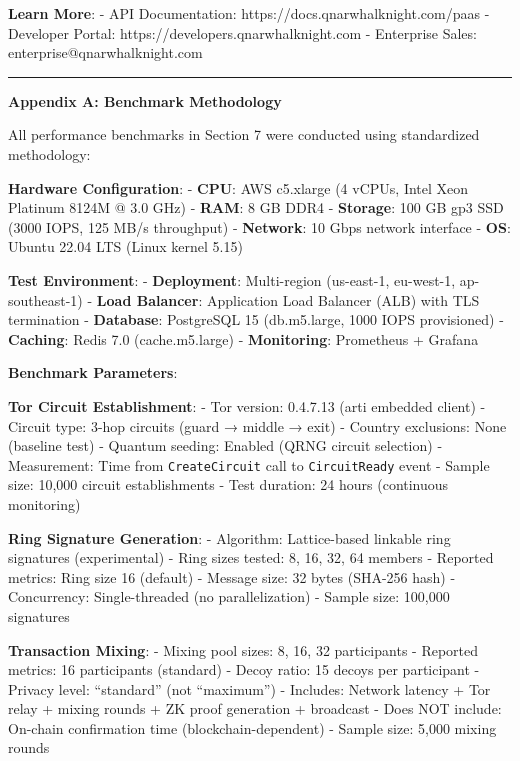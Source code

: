 \documentclass[
  11pt,
]{article}
\begin{document}
\textbf{Learn More}: - API Documentation:
https://docs.qnarwhalknight.com/paas - Developer Portal:
https://developers.qnarwhalknight.com - Enterprise Sales:
enterprise@qnarwhalknight.com

\begin{center}\rule{0.5\linewidth}{0.5pt}\end{center}

\textbf{Appendix A: Benchmark Methodology}

All performance benchmarks in Section 7 were conducted using
standardized methodology:

\textbf{Hardware Configuration}: - \textbf{CPU}: AWS c5.xlarge (4 vCPUs,
Intel Xeon Platinum 8124M @ 3.0 GHz) - \textbf{RAM}: 8 GB DDR4 -
\textbf{Storage}: 100 GB gp3 SSD (3000 IOPS, 125 MB/s throughput) -
\textbf{Network}: 10 Gbps network interface - \textbf{OS}: Ubuntu 22.04
LTS (Linux kernel 5.15)

\textbf{Test Environment}: - \textbf{Deployment}: Multi-region
(us-east-1, eu-west-1, ap-southeast-1) - \textbf{Load Balancer}:
Application Load Balancer (ALB) with TLS termination -
\textbf{Database}: PostgreSQL 15 (db.m5.large, 1000 IOPS provisioned) -
\textbf{Caching}: Redis 7.0 (cache.m5.large) - \textbf{Monitoring}:
Prometheus + Grafana

\textbf{Benchmark Parameters}:

\textbf{Tor Circuit Establishment}: - Tor version: 0.4.7.13 (arti
embedded client) - Circuit type: 3-hop circuits (guard → middle → exit)
- Country exclusions: None (baseline test) - Quantum seeding: Enabled
(QRNG circuit selection) - Measurement: Time from \texttt{CreateCircuit}
call to \texttt{CircuitReady} event - Sample size: 10,000 circuit
establishments - Test duration: 24 hours (continuous monitoring)

\textbf{Ring Signature Generation}: - Algorithm: Lattice-based linkable
ring signatures (experimental) - Ring sizes tested: 8, 16, 32, 64
members - Reported metrics: Ring size 16 (default) - Message size: 32
bytes (SHA-256 hash) - Concurrency: Single-threaded (no parallelization)
- Sample size: 100,000 signatures

\textbf{Transaction Mixing}: - Mixing pool sizes: 8, 16, 32 participants
- Reported metrics: 16 participants (standard) - Decoy ratio: 15 decoys
per participant - Privacy level: ``standard'' (not ``maximum'') -
Includes: Network latency + Tor relay + mixing rounds + ZK proof
generation + broadcast - Does NOT include: On-chain confirmation time
(blockchain-dependent) - Sample size: 5,000 mixing rounds
\end{document}
